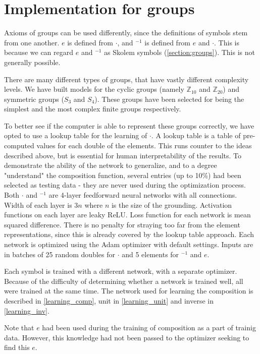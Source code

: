 \section{Implementation for groups}
\label{section:group_impl}
Axioms of groups can be used differently, since the definitions of symbols stem from one another. $e$ is defined from $\cdot$, and $^{-1}$ is defined from $e$ and $\cdot$. This is because we can regard $e$ and $^{-1}$ as Skolem symbols (\autoref{section:groups}). This is not generally possible.

There are many different types of groups, that have vastly different complexity levels. We have built models for the cyclic groups (namely $\mathbb{Z}_{10}$ and $\mathbb{Z}_{20}$) and symmetric groups ($S_3$ and $S_4$). These groups have been selected for being the simplest and the most complex finite groups respectively.

To better see if the computer is able to represent these groups correctly, we have opted to use a lookup table for the learning of $\cdot$. A lookup table is a table of pre-computed values for each double of the elements. This runs counter to the ideas described above, but is essential for human interpretability of the results. To demonstrate the ability of the network to generalize, and to a degree "understand" the composition function, several entries (up to 10\%) had been selected as testing data - they are never used during the optimization process.\\

Both $\cdot$ and $^{-1}$ are 4-layer feedforward neural networks with all connections. Width of each layer is $3n$ where $n$ is the size of the grounding. Activation functions on each layer are leaky ReLU. Loss function for each network is mean squared difference. There is no penalty for straying too far from the element representations, since this is already covered by the lookup table approach. Each network is optimized using the Adam optimizer with default settings. Inputs are in batches of 25 random doubles for $\cdot$ and 5 elements for $^{-1}$ and $e$. 

Each symbol is trained with a different network, with a separate optimizer. Because of the difficulty of determining whether a network is trained well, all were trained at the same time. The network used for learning the composition is described in \autoref{learning_comp}, unit in \autoref{learning_unit} and inverse in \autoref{learning_inv}. 

Note that $e$ had been used during the training of composition as a part of trainig data. However, this knowledge had not been passed to the optimizer seeking to find this $e$.

